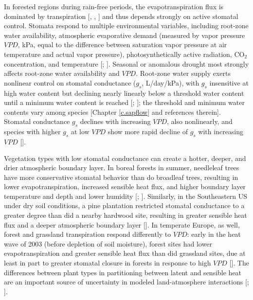 In forested regions during rain-free periods, the evapotranspiration flux is dominated by transpiration [\cite{wilson2001comparison}, \cite{dirmeyer2005second}, \cite{jasechko2013terrestrial}] and thus depends strongly on active stomatal control.  Stomata respond to multiple environmental variables, including root-zone water availability, atmospheric evaporative demand (measured by vapor pressure $VPD$, kPa, equal to the difference between saturation vapor pressure at air temperature and actual vapor pressure), photosynthetically active radiation, CO$_2$ concentration, and temperature [\cite{jarvis1976interpretation}; \cite{collatz1991physiological}].  Seasonal or anomalous drought most strongly affects root-zone water availability and $VPD$.  Root-zone water supply exerts nonlinear control on stomatal conductance ($g_s$, L/day/kPa), with $g_s$ insensitive at high water content but declining nearly linearly below a threshold water content until a minimum water content is reached [\cite{feddes}; \cite{chen2008observations}]; the threshold and minimum water contents vary among species [Chapter \ref{c.sapflow} and references therein].  Stomatal conductance $g_s$ declines with increasing $VPD$, also nonlinearly, and species with higher $g_s$ at low $VPD$ show more rapid decline of $g_s$ with increasing $VPD$ [\cite{oren1999survey}].

Vegetation types with low stomatal conductance can create a hotter, deeper, and drier atmospheric boundary layer.  In boreal forests in summer, needleleaf trees have more conservative stomatal behavior than do broadleaf trees, resulting in lower evapotranspiration, increased sensible heat flux, and higher boundary layer temperature and depth and lower humidity [\cite{baldocchi2000climate}; \cite{liu2005changes}].  Similarly, in the Southeastern US under dry soil conditions, a pine plantation restricted stomatal conductance to a greater degree than did a nearby hardwood site, resulting in greater sensible heat flux and a deeper atmospheric boundary layer [\cite{Juang:2007ve}].  In temperate Europe, as well, forest and grassland transpiration respond differently to $VPD$: early in the heat wave of 2003 (before depletion of soil moisture), forest sites had lower evapotranspiration and greater sensible heat flux than did grassland sites, due at least in part to greater stomatal closure in forests in response to high $VPD$ [\cite{teuling2010contrasting}].  The differences between plant types in partitioning between latent and sensible heat are an important source of uncertainty in modeled land-atmosphere interactions [\cite{bonan}; \cite{de2012determining}].

